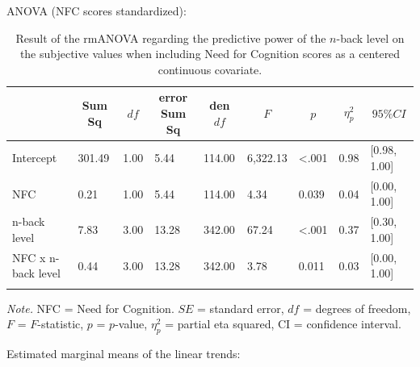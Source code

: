 \documentclass[
  man,floatsintext]{apa6}
\begin{document}
ANOVA (NFC scores standardized):

\begin{table}[H]

\begin{center}
\begin{threeparttable}

\caption{\label{tab:unnamed-chunk-18}Result of the rmANOVA regarding the predictive power of the $n$-back level on the subjective values when including Need for Cognition scores as a centered continuous covariate.}

\begin{tabular}{lllllllll}
\toprule
 & \multicolumn{1}{c}{Sum Sq} & \multicolumn{1}{c}{$df$} & \multicolumn{1}{c}{error Sum Sq} & \multicolumn{1}{c}{den $df$} & \multicolumn{1}{c}{$F$} & \multicolumn{1}{c}{$p$} & \multicolumn{1}{c}{$\eta_{p}^{2}$} & \multicolumn{1}{c}{$95\% CI$}\\
\midrule
Intercept & 301.49 & 1.00 & 5.44 & 114.00 & 6,322.13 & <.001 & 0.98 & {}[0.98, 1.00]\\
NFC & 0.21 & 1.00 & 5.44 & 114.00 & 4.34 & 0.039 & 0.04 & {}[0.00, 1.00]\\
n-back level & 7.83 & 3.00 & 13.28 & 342.00 & 67.24 & <.001 & 0.37 & {}[0.30, 1.00]\\
NFC x n-back level & 0.44 & 3.00 & 13.28 & 342.00 & 3.78 & 0.011 & 0.03 & {}[0.00, 1.00]\\
\bottomrule
\addlinespace
\end{tabular}

\begin{tablenotes}[para]
\normalsize{\textit{Note.} NFC = Need for Cognition. $SE$ = standard error, $df$ = degrees of freedom, $F$ = $F$-statistic, $p$ = $p$-value, $\eta_{p}^{2}$ = partial eta squared, CI = confidence interval.}
\end{tablenotes}

\end{threeparttable}
\end{center}

\end{table}

Estimated marginal means of the linear trends:
\end{document}
